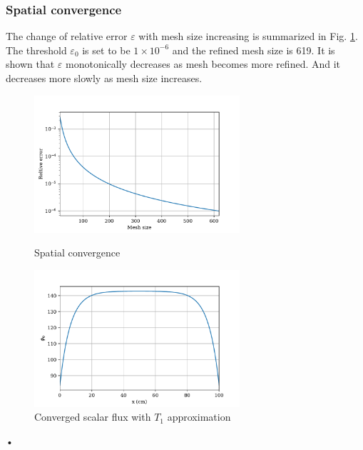 \documentclass[11pt]{article}
\begin{document}
\begin{spacing}{1.5}
\subsubsection{Spatial convergence}
 The change of relative error $\varepsilon$ with mesh size increasing is summarized in Fig. \ref{fig:spa_conv}. The threshold $\varepsilon_0$ is set to be $1\times10^{-6}$ and the refined mesh size is 619. It is shown that $\varepsilon$ monotonically decreases as mesh becomes more refined. And it decreases more slowly as mesh size increases. 
\begin{figure}[htbp]
\begin{minipage}[t]{0.5\textwidth}
\centering
\includegraphics[width=3in]{conv_mesh_2.pdf}
\caption{Spatial convergence}\label{fig:spa_conv}
\end{minipage}
\begin{minipage}[t]{0.5\textwidth}
\centering
\includegraphics[width=3in]{T1_final_2.pdf}
\caption{Converged scalar flux with $T_1$ approximation}
\end{minipage}
\end{figure}•

\end{spacing}
\end{document}
